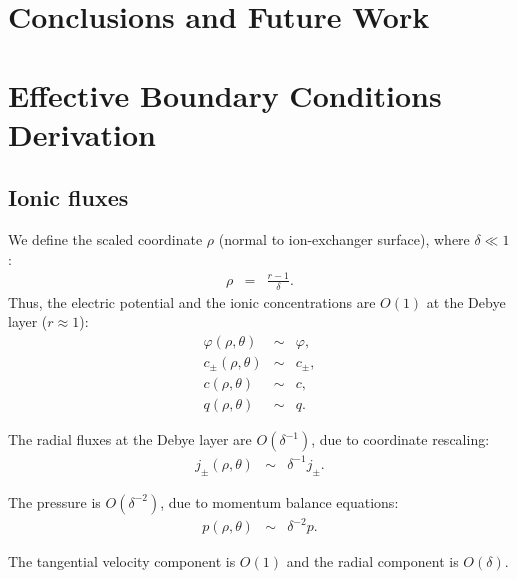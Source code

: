 \section{Conclusions and Future Work} \label{conclusions}


\appendix

\section{Effective Boundary Conditions Derivation} \label{append:effbnd}

\subsection{Ionic fluxes}

We define the scaled coordinate $\rho$ (normal to ion-exchanger surface), where $\delta \ll 1$:
\begin{eqnarray*}
  \rho &=& \frac{r-1}{\delta}. 
\end{eqnarray*}
Thus, the electric potential and the ionic concentrations are $O(1)$ at the Debye layer ($r \approx 1$):
\begin{eqnarray*}
  \varphi(\rho,\theta) &\sim& \varphi, \\
  c_\pm(\rho,\theta) &\sim& c_\pm, \\
  c(\rho,\theta) &\sim& c, \\
  q(\rho,\theta) &\sim& q.
\end{eqnarray*}

The radial fluxes at the Debye layer are $O(\delta^{-1})$, due to coordinate rescaling:
\begin{eqnarray*}
  j_\pm(\rho, \theta) &\sim& \delta^{-1} j_\pm.
\end{eqnarray*}

The pressure is $O(\delta^{-2})$, due to momentum balance equations:
\begin{eqnarray*}
  p(\rho, \theta) &\sim& \delta^{-2} p.
\end{eqnarray*}

The tangential velocity component is $O(1)$ and the radial component is $O(\delta)$.

